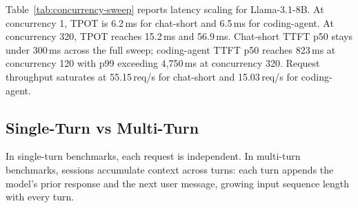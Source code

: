 Table~\ref{tab:concurrency-sweep} reports latency scaling for Llama-3.1-8B. At concurrency 1, TPOT is 6.2\,ms for chat-short and 6.5\,ms for coding-agent. At concurrency 320, TPOT reaches 15.2\,ms and 56.9\,ms. Chat-short TTFT p50 stays under 300\,ms across the full sweep; coding-agent TTFT p50 reaches 823\,ms at concurrency 120 with p99 exceeding 4{,}750\,ms at concurrency 320. Request throughput saturates at 55.15\,req/s for chat-short and 15.03\,req/s for coding-agent.


\subsection{Single-Turn vs Multi-Turn}
\label{sec:single_vs_multi}

In single-turn benchmarks, each request is independent. In multi-turn benchmarks, sessions accumulate context across turns: each turn appends the model's prior response and the next user message, growing input sequence length with every turn.

